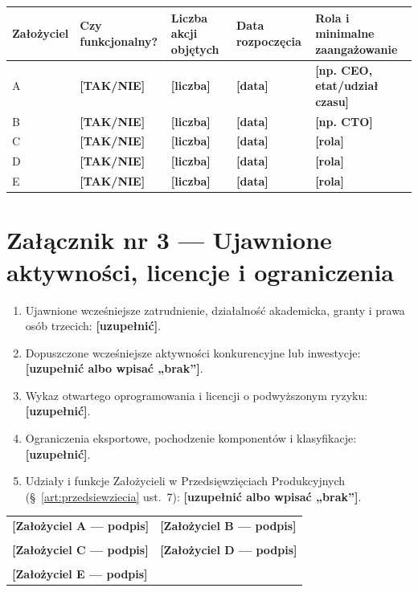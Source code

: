 \documentclass[12pt,a4paper]{report}
\newcommand{\field}[1]{\textbf{[#1]}}
\begin{document}
\begin{longtable}{@{}p{2.2cm} p{3.0cm} p{3.0cm} p{3.0cm} p{2.8cm}@{}}
\toprule
\textbf{Założyciel} & \textbf{Czy funkcjonalny?} & \textbf{Liczba akcji objętych} & \textbf{Data rozpoczęcia} & \textbf{Rola i minimalne zaangażowanie} \\
\midrule
A & \field{TAK/NIE} & \field{liczba} & \field{data} & \field{np. CEO, etat/udział czasu} \\
B & \field{TAK/NIE} & \field{liczba} & \field{data} & \field{np. CTO} \\
C & \field{TAK/NIE} & \field{liczba} & \field{data} & \field{rola} \\
D & \field{TAK/NIE} & \field{liczba} & \field{data} & \field{rola} \\
E & \field{TAK/NIE} & \field{liczba} & \field{data} & \field{rola} \\
\bottomrule
\end{longtable}

\section*{Załącznik nr 3 — Ujawnione aktywności, licencje i ograniczenia}

\begin{enumerate}
  \item Ujawnione wcześniejsze zatrudnienie, działalność akademicka, granty i prawa osób trzecich: \field{uzupełnić}.
  \item Dopuszczone wcześniejsze aktywności konkurencyjne lub inwestycje: \field{uzupełnić albo wpisać „brak”}.
  \item Wykaz otwartego oprogramowania i licencji o podwyższonym ryzyku: \field{uzupełnić}.
  \item Ograniczenia eksportowe, pochodzenie komponentów i klasyfikacje: \field{uzupełnić}.
  \item Udziały i funkcje Założycieli w Przedsięwzięciach Produkcyjnych (§~\ref{art:przedsiewziecia} ust.~7): \field{uzupełnić albo wpisać „brak”}.
\end{enumerate}

\vspace{1cm}
\begin{center}
\begin{tabularx}{\textwidth}{X X}
\field{Założyciel A — podpis} & \field{Założyciel B — podpis} \\
\\[1.3cm]
\field{Założyciel C — podpis} & \field{Założyciel D — podpis} \\
\\[1.3cm]
\field{Założyciel E — podpis} & \\
\end{tabularx}
\end{center}
\end{document}
